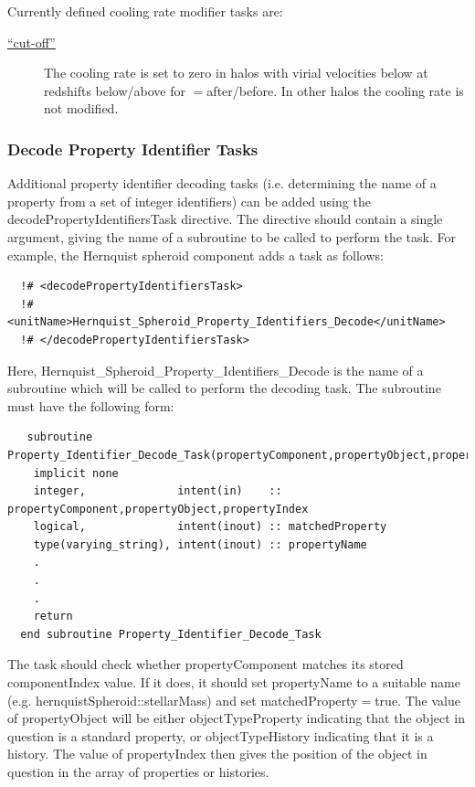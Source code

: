 Currently defined cooling rate modifier tasks are:
\begin{description}
\item [\hyperlink{cooling.cooling_rate.modifier.cut_off.F90:cooling_rates_modifier_cut_off:cooling_rate_modifier_cut_off}{``cut-off''}] The cooling rate is set to zero in halos with virial velocities below {\normalfont \ttfamily [coolingCutOffVelocity]} at redshifts below/above {\normalfont \ttfamily [coolingCutOffRedshift]} for {\normalfont \ttfamily [coolingCutOffWhen]}$=${\normalfont \ttfamily after/before}. In other halos the cooling rate is not modified.
\end{description}

\subsubsection{Decode Property Identifier Tasks}\label{sec:DecodePropertyIndentifierTask}

Additional property identifier decoding tasks (i.e. determining the name of a property from a set of integer identifiers) can be added using the {\normalfont \ttfamily decodePropertyIdentifiersTask} directive. The directive should contain a single argument, giving the name of a subroutine to be called to perform the task. For example, the Hernquist spheroid component adds a task as follows:
\begin{verbatim}
  !# <decodePropertyIdentifiersTask>
  !#  <unitName>Hernquist_Spheroid_Property_Identifiers_Decode</unitName>
  !# </decodePropertyIdentifiersTask>
\end{verbatim}
Here, {\normalfont \ttfamily Hernquist\_Spheroid\_Property\_Identifiers\_Decode} is the name of a subroutine which will be called to perform the decoding task. The subroutine must have the following form:
\begin{verbatim}
   subroutine Property_Identifier_Decode_Task(propertyComponent,propertyObject,propertyIndex,matchedProperty,propertyName)
    implicit none
    integer,              intent(in)    :: propertyComponent,propertyObject,propertyIndex
    logical,              intent(inout) :: matchedProperty
    type(varying_string), intent(inout) :: propertyName
    .
    .
    .
    return
  end subroutine Property_Identifier_Decode_Task
\end{verbatim}
The task should check whether {\normalfont \ttfamily propertyComponent} matches its stored {\normalfont \ttfamily componentIndex} value. If it does, it should set {\normalfont \ttfamily propertyName} to a suitable name (e.g. {\normalfont \ttfamily hernquistSpheroid::stellarMass}) and set {\normalfont \ttfamily matchedProperty}$=${\normalfont \ttfamily true}. The value of {\normalfont \ttfamily propertyObject} will be either {\normalfont \ttfamily objectTypeProperty} indicating that the object in question is a standard property, or {\normalfont \ttfamily objectTypeHistory} indicating that it is a history. The value of {\normalfont \ttfamily propertyIndex} then gives the position of the object in question in the array of properties or histories.

